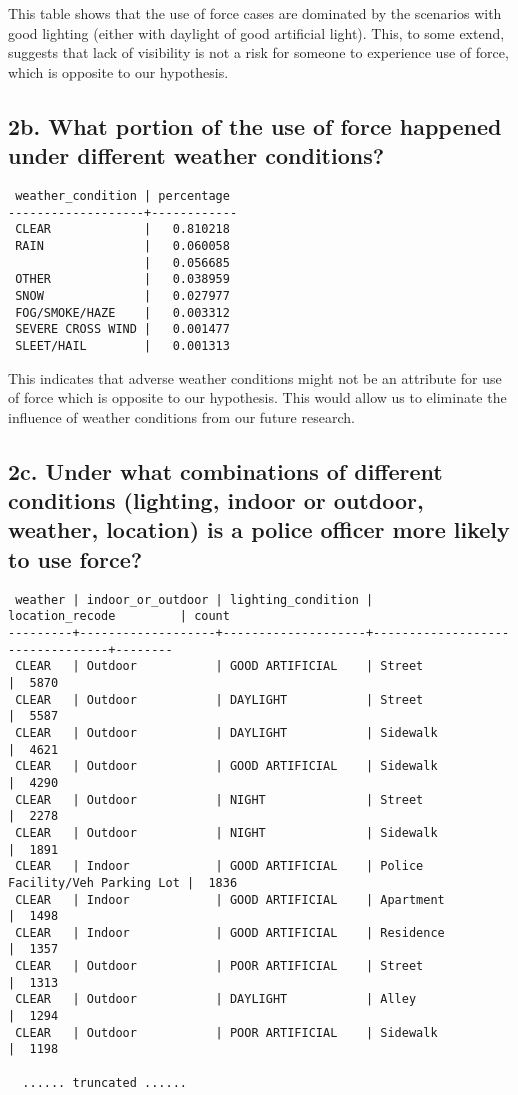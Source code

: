 \documentclass[10pt]{article}
\begin{document}
This table shows that the use of force cases are dominated by the scenarios with good lighting (either with daylight of good artificial light). This, to some extend, suggests that lack of visibility is not a risk for someone to experience use of force, which is opposite to our hypothesis.


\subsection*{2b. What portion of the use of force happened under different weather conditions?}

\begin{verbatim}
 weather_condition | percentage
-------------------+------------
 CLEAR             |   0.810218
 RAIN              |   0.060058
                   |   0.056685
 OTHER             |   0.038959
 SNOW              |   0.027977
 FOG/SMOKE/HAZE    |   0.003312
 SEVERE CROSS WIND |   0.001477
 SLEET/HAIL        |   0.001313
\end{verbatim}

This indicates that adverse weather conditions might not be an attribute for use of force which is opposite to our hypothesis. This would allow us to eliminate the influence of weather conditions from our future research.


\subsection*{2c. Under what combinations of different conditions (lighting, indoor or outdoor, weather, location) is a police officer more likely to use force?}

\begin{verbatim}
 weather | indoor_or_outdoor | lighting_condition |         location_recode         | count
---------+-------------------+--------------------+---------------------------------+--------
 CLEAR   | Outdoor           | GOOD ARTIFICIAL    | Street                          |  5870
 CLEAR   | Outdoor           | DAYLIGHT           | Street                          |  5587
 CLEAR   | Outdoor           | DAYLIGHT           | Sidewalk                        |  4621
 CLEAR   | Outdoor           | GOOD ARTIFICIAL    | Sidewalk                        |  4290
 CLEAR   | Outdoor           | NIGHT              | Street                          |  2278
 CLEAR   | Outdoor           | NIGHT              | Sidewalk                        |  1891
 CLEAR   | Indoor            | GOOD ARTIFICIAL    | Police Facility/Veh Parking Lot |  1836
 CLEAR   | Indoor            | GOOD ARTIFICIAL    | Apartment                       |  1498
 CLEAR   | Indoor            | GOOD ARTIFICIAL    | Residence                       |  1357
 CLEAR   | Outdoor           | POOR ARTIFICIAL    | Street                          |  1313
 CLEAR   | Outdoor           | DAYLIGHT           | Alley                           |  1294
 CLEAR   | Outdoor           | POOR ARTIFICIAL    | Sidewalk                        |  1198

  ...... truncated ......
\end{verbatim}
\end{document}
